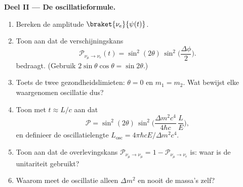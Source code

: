 \begin{problem}
\medskip\noindent\textbf{Deel II --- De oscillatieformule.}
\begin{enumerate}[resume]
  \item Bereken de amplitude $\braket{\nu_e}{\psi(t)}$.
  \item Toon aan dat de verschijningskans
        \[
        \mathcal P_{\nu_\mu \to \nu_e}(t) =
        \sin^2(2\theta)\,\sin^2\Big(\frac{\Delta\phi}{2}\Big) .
        \]
        bedraagt. (Gebruik $2\sin\theta\cos\theta = \sin2\theta$.)
  \item Toets de twee gezondheidslimieten: $\theta = 0$ en $m_1 = m_2$.
        Wat bewijst elke waargenomen oscillatie dus?
  \item Toon met $t \approx L/c$ aan dat
        \[
        \mathcal P = \sin^2(2\theta)\,
        \sin^2\Big(\frac{\Delta m^2c^4}{4\hbar c}\,\frac{L}{E}\Big) ,
        \]
        en definieer de oscillatielengte $L_{\text{osc}} =
        4\pi\hbar cE/\Delta m^2c^4$.
  \item Toon aan dat de overlevingskans $\mathcal P_{\nu_\mu \to
        \nu_\mu} = 1 - \mathcal P_{\nu_\mu\to\nu_e}$ is: waar is de
        unitariteit gebruikt?
  \item Waarom meet de oscillatie alleen $\Delta m^2$ en nooit de
        massa's zelf?
\end{enumerate}


\end{problem}

